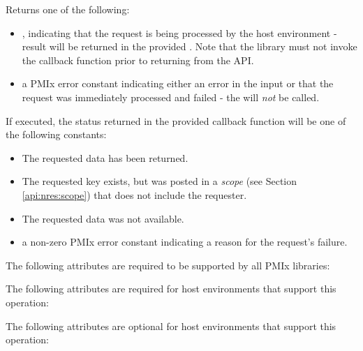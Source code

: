 Returns one of the following:

\begin{itemize}
    \item {}, indicating that the request is being processed by the host environment - result will be returned in the provided . Note that the library must not invoke the callback function prior to returning from the \ac{API}.
    \item a \ac{PMIx} error constant indicating either an error in the input or that the request was immediately processed and failed - the  will \textit{not} be called.
\end{itemize}

If executed, the status returned in the provided callback function will be one of the following constants:

\begin{itemize}
\item {} The requested data has been returned.
\item {} The requested key exists, but was posted in a \emph{scope} (see Section \ref{api:nres:scope}) that does not include the requester.
\item {} The requested data was not available.
\item a non-zero \ac{PMIx} error constant indicating a reason for the request's failure.
\end{itemize}

\reqattrstart
The following attributes are required to be supported by all \ac{PMIx} libraries:


\divider

The following attributes are required for host environments that support this operation:


\reqattrend

\optattrstart
The following attributes are optional for host environments that support this operation:


